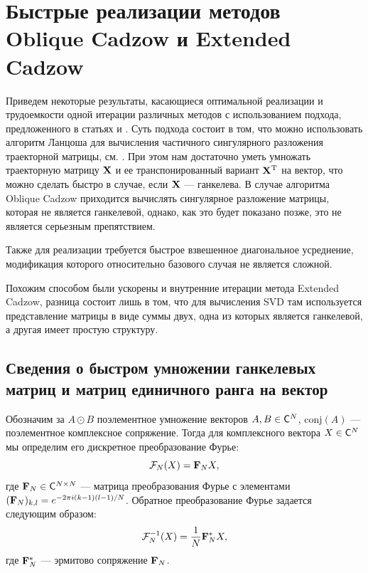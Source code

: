 \documentclass[12pt, specialist, subf,href,colorlinks=true,substylefile = spbu.rtx]{disser}
\theoremstyle{remark}
\theoremstyle{definition}
\begin{document}
\chapter{Быстрые реализации методов Oblique Cadzow и Extended Cadzow}
\label{sec:fast}
Приведем некоторые результаты, касающиеся оптимальной реализации и трудоемкости одной итерации различных методов с использованием подхода, предложенного в статьях \cite{Korobeynikov2010} и \cite{Golyandina2013a}. Суть подхода состоит в том, что можно использовать алгоритм Ланцоша для вычисления частичного сингулярного разложения траекторной матрицы, см. \cite{Korobeynikov2010}. При этом нам достаточно уметь умножать траекторную матрицу $\mathbf{X}$ и ее транспонированный вариант $\mathbf{X}^{\mathrm{T}}$ на вектор, что можно сделать быстро в случае, если $\mathbf{X}$ --- ганкелева. В случае алгоритма Oblique Cadzow приходится вычислять сингулярное разложение матрицы, которая не является ганкелевой, однако, как это будет показано позже, это не является серьезным препятствием.

Также для реализации требуется быстрое взвешенное диагональное усреднение, модификация которого относительно базового случая не является сложной.

Похожим способом были ускорены и внутренние итерации метода Extended Cadzow, разница состоит лишь в том, что для вычисления SVD там используется представление матрицы в виде суммы двух, одна из которых является ганкелевой, а другая имеет простую структуру.

\section{Сведения о быстром умножении ганкелевых матриц и матриц единичного ранга на вектор}
Обозначим за $A \odot B$ поэлементное умножение векторов $A, B \in \mathsf{C}^N$, $\text{conj}(A)$ --- поэлементное комплексное сопряжение. Тогда для комплексного вектора $X \in \mathsf{C}^N$ мы определим его дискретное преобразование Фурье:
\begin{equation}\label{Fourier_transform}
\mathcal{F}_N(X) = \mathbf{F}_N X,
\end{equation}
где $\mathbf{F}_N \in \mathsf{C}^{N \times N}$ --- матрица преобразования Фурье с элементами $(\mathbf{F}_N)_{k,l} = e^{-2 \pi i(k-1)(l-1)/N}$. Обратное преобразование Фурье задается следующим образом:
\begin{equation*}
\mathcal{F}^{-1}_N(X) = \frac{1}{N}\mathbf{F}^*_N X,
\end{equation*}
где $\mathbf{F}^*_N$ --- эрмитово сопряжение $\mathbf{F}_N$.
\end{document}
